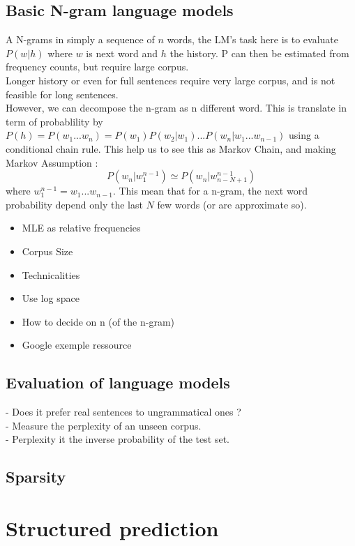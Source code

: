 			\subsection{Basic N-gram language models}
				A N-grams in simply a sequence of $n$ words, the LM's task here is to evaluate $P(w|h)$ where $w$ is next word and $h$ the history. P can then be estimated from frequency counts, but require large corpus.\\
				Longer history or even for full sentences require very large corpus, and is not feasible for long sentences.\\
				However, we can decompose the n-gram as n different word. This is translate in term of probablility by $P(h) = P(w_1 ... w_n) = P(w_1)P(w_2 | w_1)...P(w_n | w_1 ... w_{n-1})$ using a conditional chain rule. This help us to see this as Markov Chain, and making Markov Assumption : \\
				\[
					P(w_n | w_1^{n-1}) \simeq P(w_n | w_{n-N+1}^{n-1})
				\]
				where $w_1^{n-1} = w_1 ... w_{n-1}$. This mean that for a n-gram, the next word probability depend only the last $N$ few words (or are approximate so).

				\begin{itemize}
					\item MLE as relative frequencies
					\item Corpus Size
					\item Technicalities
					\item Use log space
					\item How to decide on n (of the n-gram)
					\item Google exemple ressource
				\end{itemize}
			\subsection{Evaluation of language models}
				- Does it prefer real sentences to ungrammatical ones ?\\
				- Measure the perplexity of an unseen corpus.\\
				- Perplexity it the inverse probability of the test set. 
			\subsection{Sparsity}

		\section{Structured prediction}

